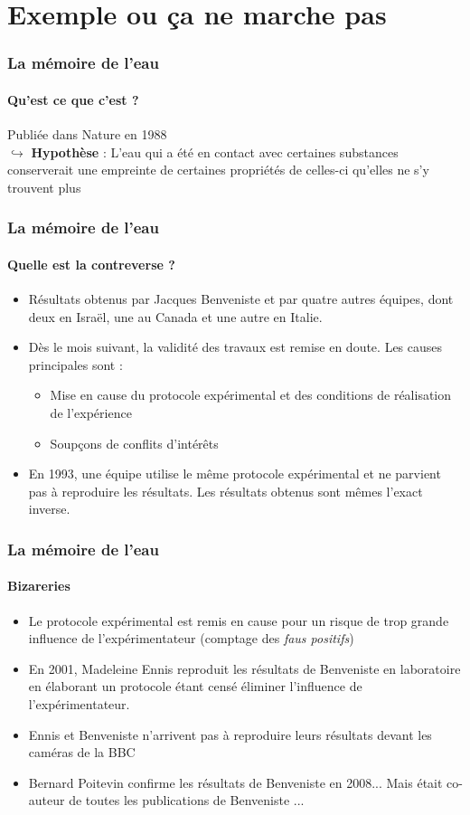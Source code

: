 \documentclass[11pt]{beamer}
\begin{document}
\section{Exemple ou ça ne marche pas}
\begin{frame}
\frametitle{La mémoire de l'eau}
\framesubtitle{Qu'est ce que c'est ?}
Publiée dans Nature en 1988
\pause 
\\$\hookrightarrow$ \textbf{Hypothèse} : L’eau qui a été en contact avec certaines substances conserverait une empreinte de certaines propriétés de celles-ci qu'elles ne s’y trouvent plus
\pause 
\end{frame}
\begin{frame}
\frametitle{La mémoire de l'eau}
\framesubtitle{Quelle est la contreverse ?}
\begin{itemize}
	\item Résultats obtenus par Jacques  Benveniste et par quatre autres équipes, dont deux en Israël, une au Canada et une autre en Italie. \pause
	\item Dès le mois suivant, la validité des travaux est remise en doute. Les causes principales sont : 
		\begin{itemize}
			\item Mise en cause du protocole expérimental et des conditions de réalisation de l'expérience
			\item Soupçons de conflits d'intérêts
		\end{itemize}  \pause 
	\item En 1993, une équipe utilise le même protocole expérimental et ne parvient pas à reproduire les résultats. Les résultats obtenus sont mêmes l'exact inverse.
\end{itemize}
\end{frame}
\begin{frame}
\frametitle{La mémoire de l'eau}
\framesubtitle{Bizareries}
\begin{itemize}
	\item Le protocole expérimental est remis en cause pour un risque de trop grande influence de l'expérimentateur (comptage des \textit{faus positifs}) \pause 
	\item En 2001, Madeleine Ennis reproduit les résultats de Benveniste en laboratoire en élaborant un protocole étant censé éliminer l'influence de l'expérimentateur. \pause 
	\item Ennis et Benveniste n'arrivent pas à reproduire leurs résultats devant les caméras de la BBC
	\item Bernard Poitevin confirme les résultats de Benveniste en 2008... \pause  Mais était co-auteur de toutes les publications de Benveniste ...
\end{itemize}
\end{frame}
\end{document}
